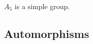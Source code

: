 \documentclass[../main]{subfiles}
\begin{document}
 
 \begin{thm}
  $A_5$ is a simple group.
 \end{thm}
 
 
 \subsection{Automorphisms}






 
 
 
 
 
 
 
 
 
 
 
 
 
 
 
 
 
 
 
 
 
 
 
 
 
 
 
 
 
 
 
\end{document}
